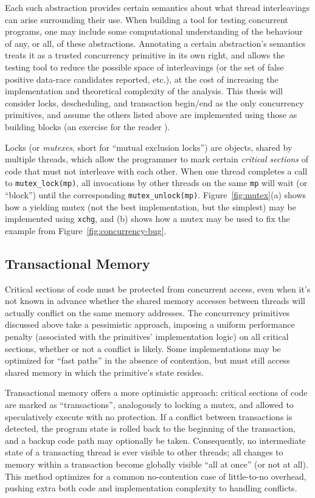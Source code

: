 Each such abstraction provides certain semantics about what thread interleavings can arise surrounding their use.
When building a tool for testing concurrent programs,
one may include some computational understanding of the behaviour of any, or all, of these abstractions.
Annotating a certain abstraction's semantics treats it as a trusted concurrency primitive in its own right,
and allows the testing tool to reduce the possible space of interleavings (or the set of false positive data-race candidates reported, etc.),
at the cost of increasing the implementation and theoretical complexity of the analysis.
This thesis will consider locks, descheduling, and transaction begin/end as the only concurrency primitives,
and assume the others listed above are implemented using those as building blocks (an exercise for the reader \cite{thrlib}).

Locks (or {\em mutexes}, short for ``mutual exclusion locks'') are objects, shared by multiple threads, which allow the programmer to mark certain {\em critical sections} of code that must not interleave with each other.
When one thread completes a call to {\tt mutex\_lock(mp)}, all invocations by other threads on the same {\tt mp} will wait (or ``block'') until the corresponding {\tt mutex\_unlock(mp)}.
Figure~\ref{fig:mutex}(a) shows how a yielding mutex (not the best implementation, but the simplest) may be implemented using {\tt xchg},
and (b) shows how a mutex may be used to fix the example from Figure~\ref{fig:concurrency-bug}.


\subsection{Transactional Memory}
\label{sec:overview-tm}

Critical sections of code must be protected from concurrent access, even when it's not known in advance whether the shared memory accesses between threads will actually conflict on the same memory addresses.
The concurrency primitives discussed above take a pessimistic approach, imposing a uniform performance penalty (associated with the primitives' implementation logic) on all critical sections, whether or not a conflict is likely.
Some implementations may be optimized for ``fast paths'' in the absence of contention, but must still access shared memory in which the primitive's state resides.

Transactional memory \cite{transactional-memory} offers a more optimistic approach: critical sections of code are marked as ``transactions'', analogously to locking a mutex, and allowed to speculatively execute with no protection.
If a conflict between transactions is detected, the program state is rolled back to the beginning of the transaction, and a backup code path may optionally be taken.
Consequently, no intermediate state of a transacting thread is ever visible to other threads; all changes to memory within a transaction become globally visible ``all at once'' (or not at all).
This method optimizes for a common no-contention case of little-to-no overhead, pushing extra both code and implementation complexity to handling conflicts.

